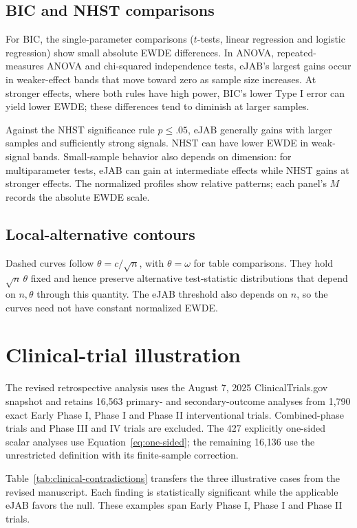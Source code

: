 \documentclass[11pt,letterpaper]{article}
\begin{document}
\subsection{BIC and NHST comparisons}
For BIC, the single-parameter comparisons (\(t\)-tests, linear regression
and logistic regression) show small absolute EWDE differences. In ANOVA,
repeated-measures ANOVA and chi-squared independence tests, eJAB's largest
gains occur in weaker-effect bands that move toward zero as sample size
increases. At stronger effects, where both rules have high power, BIC's
lower Type I error can yield lower EWDE; these differences tend to diminish
at larger samples.

Against the NHST significance rule \(p\leq.05\), eJAB generally gains with
larger samples and sufficiently strong signals. NHST can have lower EWDE
in weak-signal bands. Small-sample behavior also depends on dimension:
for multiparameter tests, eJAB can gain at intermediate effects while
NHST gains at stronger effects. The normalized profiles show relative
patterns; each panel's \(M\) records the absolute EWDE scale.

\subsection{Local-alternative contours}
Dashed curves follow \(\theta=c/\sqrt n\), with \(\theta=\omega\)
for table comparisons. They hold \(\sqrt n\,\theta\) fixed and hence
preserve alternative test-statistic distributions that depend on
\(n,\theta\) through this quantity. The eJAB threshold also depends on
\(n\), so the curves need not have constant normalized EWDE.

\section{Clinical-trial illustration}
The revised retrospective analysis uses the August 7, 2025
ClinicalTrials.gov snapshot and retains 16,563 primary- and
secondary-outcome analyses from 1,790 exact Early Phase I, Phase I and
Phase II interventional trials. Combined-phase trials and Phase III
and IV trials are excluded. The 427 explicitly one-sided scalar
analyses use Equation~\eqref{eq:one-sided}; the remaining 16,136 use
the unrestricted definition with its finite-sample correction.

Table~\ref{tab:clinical-contradictions} transfers the three illustrative
cases from the revised manuscript. Each finding is statistically
significant while the applicable eJAB favors the null. These examples
span Early Phase I, Phase I and Phase II trials.
\end{document}
